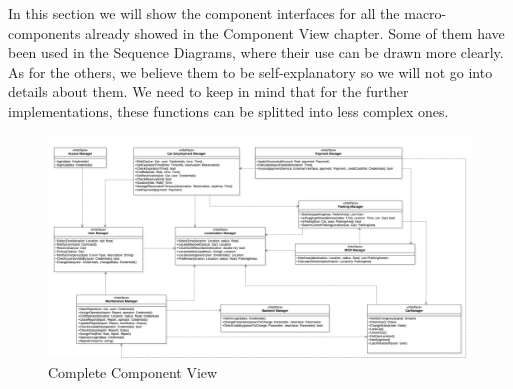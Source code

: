 	In this section we will show the component interfaces for all the macro-components already showed in the Component View chapter. Some of them have been used in the Sequence Diagrams, where their use can be drawn more clearly. As for the others, we believe them to be self-explanatory so we will not go into details about them. We need to keep in mind that for the further implementations, these functions can be splitted into less complex ones.  
		\begin{figure}
			\includegraphics[width=\hsize, center]{img/Interfaces_new.png}
			\caption{Complete Component View}
		\end{figure}
